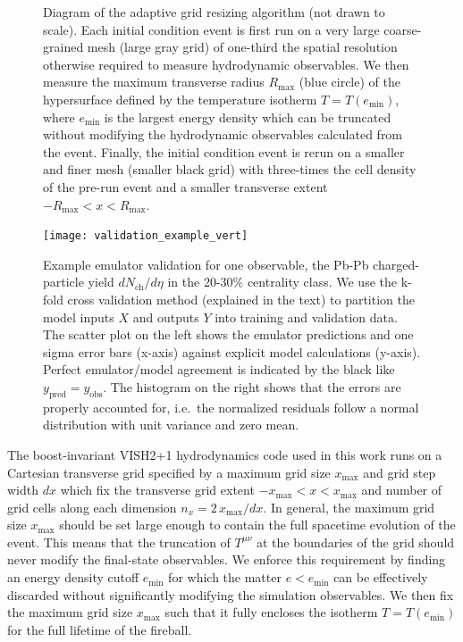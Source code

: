 \documentclass[aps,prc,reprint,amsmath,nofootinbib]{revtex4-1}
\newcommand{\nch}{N_\text{ch}}
\begin{document}
\begin{figure}[b]
  \caption{
    \label{fig:adaptive_grid}
    Diagram of the adaptive grid resizing algorithm (not drawn to scale).
    Each initial condition event is first run on a very large coarse-grained mesh (large gray grid) of one-third the spatial resolution otherwise required to measure hydrodynamic observables.
    We then measure the maximum transverse radius $R_\text{max}$ (blue circle) of the hypersurface defined by the temperature isotherm $T = T(e_\text{min})$, where $e_\text{min}$ is the largest energy density which can be truncated without modifying the hydrodynamic observables calculated from the event.
    Finally, the initial condition event is rerun on a smaller and finer mesh (smaller black grid) with three-times the cell density of the pre-run event and a smaller transverse extent $-R_\text{max} < x < R_\text{max}$.
  }
\end{figure}

\begin{figure}[t]
  \texttt{[image: validation\_example\_vert]}
  \caption{
    \label{fig:validation_example}
    Example emulator validation for one observable, the Pb-Pb charged-particle yield $d\nch/d\eta$ in the 20-30\% centrality class.
    We use the k-fold cross validation method (explained in the text) to partition the model inputs $X$ and outputs $Y$ into training and validation data.
    The scatter plot on the left shows the emulator predictions and one sigma error bars (x-axis) against explicit model calculations (y-axis).
    Perfect emulator/model agreement is indicated by the black like $y_\text{pred}=y_\text{obs}$.
    The histogram on the right shows that the errors are properly accounted for, i.e.\ the normalized residuals follow a normal distribution with unit variance and zero mean.
  }
\end{figure}

The boost-invariant VISH2+1 hydrodynamics code used in this work \cite{Song:2007ux, Shen:2014vra} runs on a Cartesian transverse grid specified by a maximum grid size $x_\text{max}$ and grid step width $dx$ which fix the transverse grid extent ${-x_\text{max} < x < x_\text{max}}$ and number of grid cells along each dimension ${n_x = 2\, x_\text{max} / dx}$.
In general, the maximum grid size $x_\text{max}$ should be set large enough to contain the full spacetime evolution of the event.
This means that the truncation of $T^{\mu\nu}$ at the boundaries of the grid should never modify the final-state observables.
We enforce this requirement by finding an energy density cutoff $e_\text{min}$ for which the matter $e < e_\text{min}$ can be effectively discarded without significantly modifying the simulation observables.
We then fix the maximum grid size $x_\text{max}$ such that it fully encloses the isotherm $T=T(e_\text{min})$ for the full lifetime of the fireball.
\end{document}
